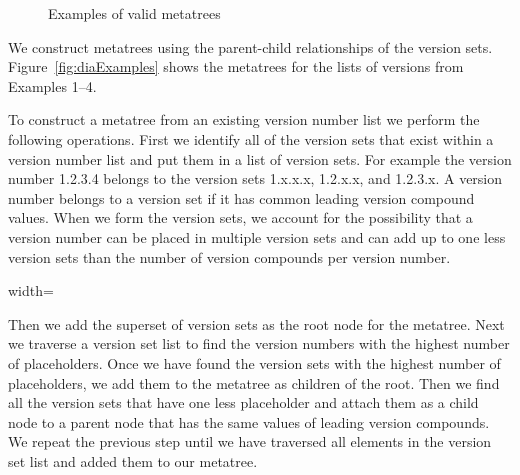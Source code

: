\documentclass[conference]{IEEEtran}
\begin{document}
\begin{figure}
\begin{center}

\end{center}
\caption{Examples of valid metatrees}
\label{fig:validMetatrees}
\end{figure}





We construct metatrees using the parent-child relationships of the version sets.
Figure~\ref{fig:diaExamples} shows the metatrees for the lists of versions from Examples 1--4. 

To construct a metatree from an existing version number list we perform the following operations.
First we identify all of the version sets that exist within a version number list and put them in a list of version sets.
For example the version number 1.2.3.4 belongs to the version sets 1.x.x.x, 1.2.x.x, and 1.2.3.x. 
A version number belongs to a version set if it has common leading version compound values.
When we form the version sets, we account for the possibility that a version number can be placed in multiple version sets and can add up to one less version sets than the number of version compounds per version number.

\begin{figure*}
 \begin{adjustbox}{width=\textwidth}

\end{adjustbox}
\caption{Examples of metatrees. The bolded version numbers are the existing version numbers for the example projects and the italicized version numbers are the \choices.}
\label{fig:diaExamples}
\end{figure*}


Then we add the superset of version sets as the root node for the metatree.
Next we traverse a version set list to find the version numbers with the highest number of placeholders.
Once we have found the version sets with the highest number of placeholders, we add them to the metatree as children of the root.
Then we find all the version sets that have one less placeholder and attach them as a child node to a parent node that has the same values of leading version compounds.
We repeat the previous step until we have traversed all elements in the version set list and added them to our metatree.
\end{document}
